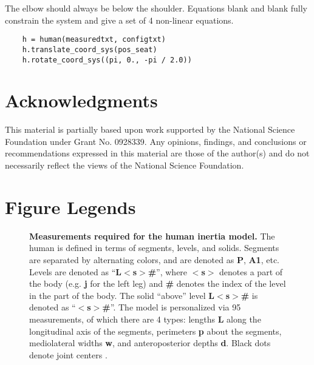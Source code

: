 \documentclass[10pt]{article}
\begin{document}
The elbow should always be below the shoulder. Equations blank and blank fully
constrain the system and give a set of 4 non-linear equations.

\begin{verbatim}
	h = human(measuredtxt, configtxt)
	h.translate_coord_sys(pos_seat)
	h.rotate_coord_sys((pi, 0., -pi / 2.0))
\end{verbatim}

\section*{Acknowledgments}
This material is partially based upon work supported by the National Science
Foundation under Grant No. 0928339. Any opinions, findings, and conclusions or
recommendations expressed in this material are those of the author(s) and do
not necessarily reflect the views of the National Science Foundation.


\section*{Figure Legends}

\begin{figure}[!ht]
\begin{center}
\end{center}
\caption{
{\bf Measurements required for the human inertia model.}  The human is defined
in terms of segments, levels, and solids. Segments are separated by alternating colors, and are denoted as \textbf{P},
\textbf{A1}, etc. Levels are denoted as ``\textbf{L$<$s$>$\#}'', where \textbf{$<$s$>$}
denotes a part of the body (e.g. \textbf{j} for the left leg) and \textbf{\#}
denotes the index of the level in the part of the body. The solid ``above''
level \textbf{L$<$s$>$\#} is denoted as ``\textbf{$<$s$>$\#}''. The model is
personalized via 95 measurements, of which there are 4 types: lengths
\textbf{L} along the longitudinal axis of the segments, perimeters \textbf{p}
about the segments, mediolateral widths \textbf{w}, and anteroposterior depths
\textbf{d}. Black dots denote joint centers \cite{Yeadon1990c}.
}
\label{fig:meas}
\end{figure}
\end{document}
